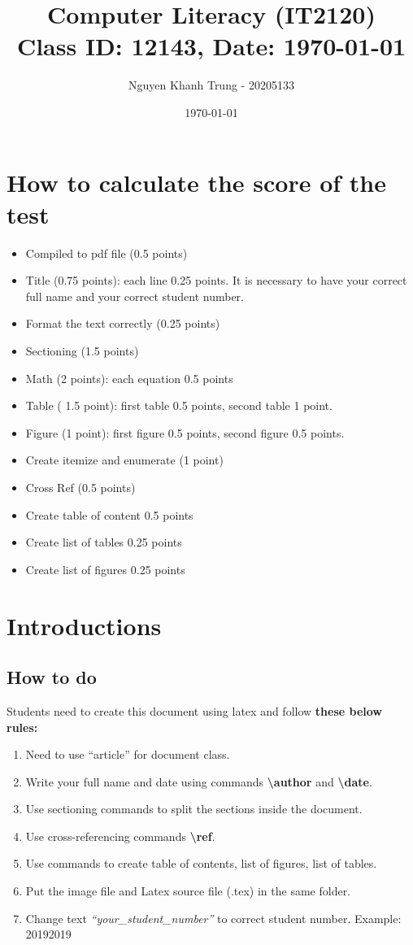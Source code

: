 \documentclass{article}
\title{Computer Literacy (IT2120) \\ Class ID: 12143, Date: \today}
\author{Nguyen Khanh Trung - 20205133}
\date{\today}
\begin{document}
	\maketitle

	\section{How to calculate the score of the test}
		\begin{itemize}
			\item Compiled to pdf file (0.5 points)
			\item Title (0.75 points): each line 0.25 points. It is necessary to have your
correct full name and your correct student number.
			\item Format the text correctly (0.25 points)
			\item Sectioning (1.5 points)
			\item Math (2 points): each equation 0.5 points
			\item Table ( 1.5 point): first table 0.5 points, second table 1 point.
			\item Figure (1 point): first figure 0.5 points, second figure 0.5 points.
			\item Create itemize and enumerate (1 point)
			\item Cross Ref (0.5 points)
			\item Create table of content 0.5 points
			\item Create list of tables 0.25 points
			\item Create list of figures 0.25 points
		\end{itemize}
		
	\section{Introductions}
		\subsection{How to do}
			Students need to create this document using latex and follow \textbf{these below rules:}
			\begin{enumerate}
				\item Need to use ``article'' for document class.
				\item Write your full name and date using commands \textbf{\textbackslash{author}} and \textbf{\textbackslash{date}}.
				\item Use sectioning commands to split the sections inside the document.
				\item Use cross-referencing commands \textbf{\textbackslash{ref}}.
				\item Use commands to create table of contents, list of figures, list of tables.
				\item Put the image file and Latex source file (.tex) in the same folder.
				\item Change text \textit{``your\_student\_number''} to correct student number. Example: 20192019
			\end{enumerate}
			
\end{document}
